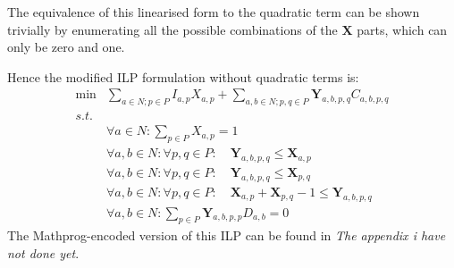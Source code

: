 The equivalence of this linearised form to the quadratic term can be shown trivially by enumerating all the possible combinations of the $\mathbf{X}$ parts, which can only be zero and one.

Hence the modified ILP formulation without quadratic terms is:
\begin{align}
	\nonumber \min & \sum_{a \in N; p \in P} I_{a,p}X_{a,p} + \sum_{a,b \in N; p,q \in P} \mathbf{Y}_{a,b,p,q}C_{a,b,p,q} \\
	\nonumber s.t. &  \\
	\nonumber & \forall a \in N : \sum_{p \in P}X_{a,p} = 1 \\
	\nonumber & \forall a,b \in N : \forall p,q \in P : \quad \mathbf{Y}_{a,b,p,q} \leq \mathbf{X}_{a,p} \\
	\nonumber & \forall a,b \in N : \forall p,q \in P : \quad \mathbf{Y}_{a,b,p,q} \leq \mathbf{X}_{p,q} \\
	\nonumber & \forall a,b \in N : \forall p,q \in P : \quad \mathbf{X}_{a,p} + \mathbf{X}_{p,q} - 1 \leq \mathbf{Y}_{a,b,p,q} \\
	\nonumber & \forall a,b \in N : \sum_{p \in P}\mathbf{Y}_{a,b,p,p}D_{a,b} = 0
\end{align}
The Mathprog-encoded version of this ILP can be found in {\em The appendix i have not done yet}.%
